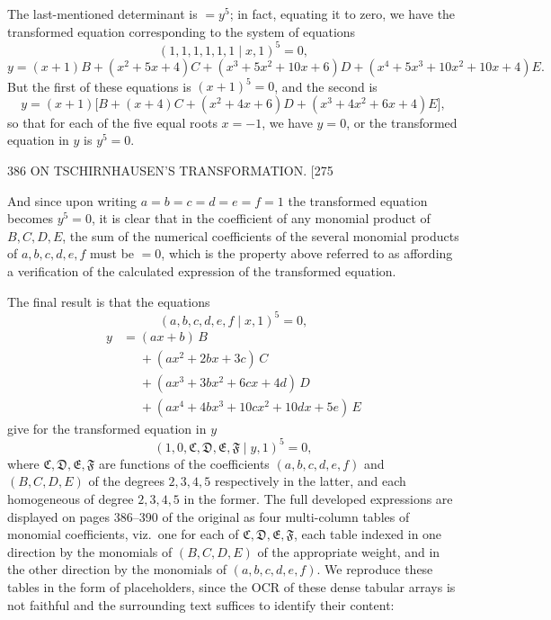 \documentclass[11pt]{article}
\begin{document}
The last-mentioned determinant is $=y^{5}$; in fact, equating it to zero, we have the
transformed equation corresponding to the system of equations
\[ (1,1,1,1,1,1 \mid x,1)^{5}=0, \]
\[ y=(x+1)B+(x^{2}+5x+4)C+(x^{3}+5x^{2}+10x+6)D+(x^{4}+5x^{3}+10x^{2}+10x+4)E. \]
But the first of these equations is $(x+1)^{5}=0$, and the second is
\[ y=(x+1)\bigl[B+(x+4)C+(x^{2}+4x+6)D+(x^{3}+4x^{2}+6x+4)E\bigr], \]
so that for each of the five equal roots $x=-1$, we have $y=0$, or the transformed
equation in $y$ is $y^{5}=0$.

\bigskip

\begin{center}
386 \hfill ON TSCHIRNHAUSEN'S TRANSFORMATION. \hfill \textsc{[275}
\end{center}

And since upon writing $a=b=c=d=e=f=1$ the transformed equation becomes
$y^{5}=0$, it is clear that in the coefficient of any monomial product of $B,C,D,E$, the
sum of the numerical coefficients of the several monomial products of $a,b,c,d,e,f$
must be $=0$, which is the property above referred to as affording a verification of the
calculated expression of the transformed equation.

The final result is that the equations
\[ (a,b,c,d,e,f \mid x,1)^{5}=0, \]
\begin{align*}
y &= (ax+b)\,B \\
  &\phantom{=} +(ax^{2}+2bx+3c)\,C \\
  &\phantom{=} +(ax^{3}+3bx^{2}+6cx+4d)\,D \\
  &\phantom{=} +(ax^{4}+4bx^{3}+10cx^{2}+10dx+5e)\,E
\end{align*}
give for the transformed equation in $y$
\[ (1,0,\mathfrak{C},\mathfrak{D},\mathfrak{E},\mathfrak{F} \mid y,1)^{5}=0, \]
where $\mathfrak{C},\mathfrak{D},\mathfrak{E},\mathfrak{F}$ are functions of the coefficients
$(a,b,c,d,e,f)$ and $(B,C,D,E)$ of the degrees $2,3,4,5$ respectively in the latter, and
each homogeneous of degree $2,3,4,5$ in the former. The full developed expressions
are displayed on pages 386--390 of the original as four multi-column tables of monomial
coefficients, viz.\ one for each of $\mathfrak{C},\mathfrak{D},\mathfrak{E},\mathfrak{F}$, each table
indexed in one direction by the monomials of $(B,C,D,E)$ of the appropriate weight,
and in the other direction by the monomials of $(a,b,c,d,e,f)$. We reproduce these
tables in the form of placeholders, since the OCR of these dense tabular arrays is
not faithful and the surrounding text suffices to identify their content:
\end{document}
